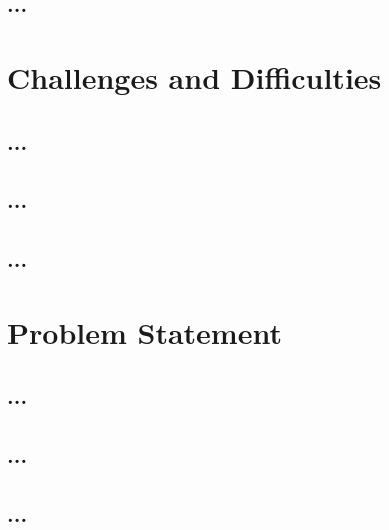 \subsection{...}


\section{Challenges and Difficulties}
\subsection{...}

\lipsum[11-15]

\subsection{...}

\subsection{...}



\section{Problem Statement}
\subsection{...}

\lipsum[21-30]

\subsection{...}


\subsection{...}
